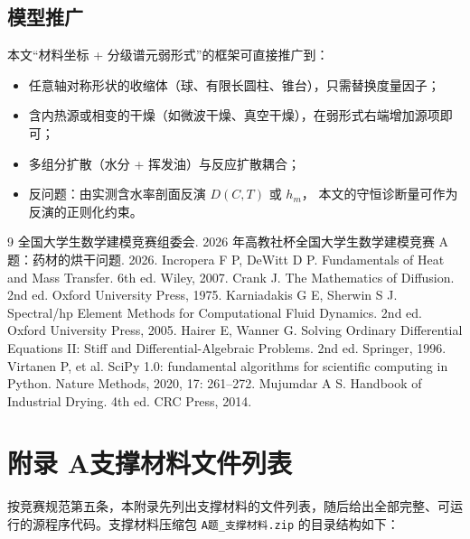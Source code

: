 \documentclass[12pt,a4paper]{ctexart}
\begin{document}
\subsection{模型推广}
本文“材料坐标 + 分级谱元弱形式”的框架可直接推广到：
\begin{itemize}[leftmargin=1.6em,itemsep=1pt]
  \item 任意轴对称形状的收缩体（球、有限长圆柱、锥台），只需替换度量因子；
  \item 含内热源或相变的干燥（如微波干燥、真空干燥），在弱形式右端增加源项即可；
  \item 多组分扩散（水分 + 挥发油）与反应扩散耦合；
  \item 反问题：由实测含水率剖面反演 $D(C,T)$ 或 $h_m$，
        本文的守恒诊断量可作为反演的正则化约束。
\end{itemize}

\begin{thebibliography}{9}
\small
{} 全国大学生数学建模竞赛组委会. 2026 年高教社杯全国大学生数学建模竞赛 A 题：药材的烘干问题. 2026.
 Incropera F P, DeWitt D P. Fundamentals of Heat and Mass Transfer. 6th ed. Wiley, 2007.
 Crank J. The Mathematics of Diffusion. 2nd ed. Oxford University Press, 1975.
 Karniadakis G E, Sherwin S J. Spectral/hp Element Methods for Computational Fluid Dynamics. 2nd ed. Oxford University Press, 2005.
 Hairer E, Wanner G. Solving Ordinary Differential Equations II: Stiff and Differential-Algebraic Problems. 2nd ed. Springer, 1996.
 Virtanen P, et al. SciPy 1.0: fundamental algorithms for scientific computing in Python. Nature Methods, 2020, 17: 261--272.
 Mujumdar A S. Handbook of Industrial Drying. 4th ed. CRC Press, 2014.
\end{thebibliography}

\newpage
\section*{附录 A\quad 支撑材料文件列表}

按竞赛规范第五条，本附录先列出支撑材料的文件列表，随后给出全部完整、可运行的源程序代码。支撑材料压缩包 \texttt{A题\_支撑材料.zip} 的目录结构如下：
\end{document}
